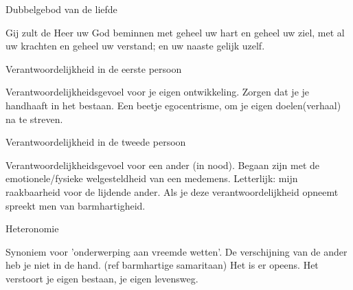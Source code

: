 \documentclass[main.tex]{subfiles}
\begin{document}
\begin{examenvraag}
    \begin{vraag}
        Dubbelgebod van de liefde
    \end{vraag}

    \begin{antwoord}
        Gij zult de Heer uw God beminnen met geheel uw hart en geheel uw ziel, 
        met al uw krachten en geheel uw verstand; 
        en uw naaste gelijk uzelf.
    \end{antwoord}
\end{examenvraag}


\begin{examenvraag}
    \begin{vraag}
        Verantwoordelijkheid in de eerste persoon
    \end{vraag}

    \begin{antwoord}
        Verantwoordelijkheidsgevoel voor je eigen ontwikkeling.
        Zorgen dat je je handhaaft in het bestaan.
        Een beetje egocentrisme, om je eigen doelen(verhaal) na te streven.
    \end{antwoord}
\end{examenvraag}


\begin{examenvraag}
    \begin{vraag}
        Verantwoordelijkheid in de tweede persoon
    \end{vraag}

    \begin{antwoord}
        Verantwoordelijkheidsgevoel voor een ander (in nood).
        Begaan zijn met de emotionele/fysieke welgesteldheid van een medemens.
        Letterlijk: mijn raakbaarheid voor de lijdende ander.
        Als je deze verantwoordelijkheid opneemt spreekt men van barmhartigheid.

    \end{antwoord}
\end{examenvraag}


\begin{examenvraag}
    \begin{vraag}
        Heteronomie
    \end{vraag}

    \begin{antwoord}
        Synoniem voor 'onderwerping aan vreemde wetten'.
        De verschijning van de ander heb je niet in de hand. (ref barmhartige samaritaan)
        Het is er opeens. 
        Het verstoort je eigen bestaan, je eigen levensweg.
    \end{antwoord}
\end{examenvraag}
\end{document}
